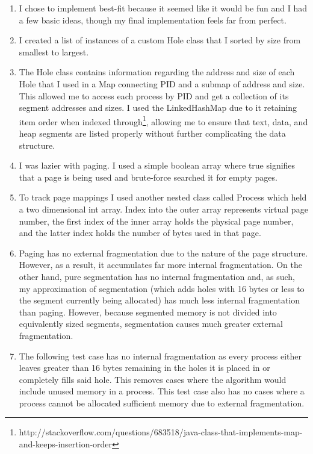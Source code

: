 \documentclass{article}
\begin{document}
\begin{enumerate}
	\item I chose to implement best-fit because it seemed like it would be fun and I had a few basic ideas, though my final implementation feels far from perfect.
	\item I created a list of instances of a custom Hole class that I sorted by size from smallest to largest.
	\item The Hole class contains information regarding the address and size of each Hole that I used in a Map connecting PID and a submap of address and size. This allowed me to access each process by PID and get a collection of its segment addresses and sizes. I used the LinkedHashMap due to it retaining item order when indexed through\footnote{http://stackoverflow.com/questions/683518/java-class-that-implements-map-and-keeps-insertion-order}, allowing me to ensure that text, data, and heap segments are listed properly without further complicating the data structure.
	\item I was lazier with paging. I used a simple boolean array where true signifies that a page is being used and brute-force searched it for empty pages.
	\item To track page mappings I used another nested class called Process which held a two dimensional int array. Index into the outer array represents virtual page number, the first index of the inner array holds the physical page number, and the latter index holds the number of bytes used in that page.
	\item Paging has no external fragmentation due to the nature of the page structure. However, as a result, it accumulates far more internal fragmentation. On the other hand, pure segmentation has no internal fragmentation and, as such, my approximation of segmentation (which adds holes with 16 bytes or less to the segment currently being allocated) has much less internal fragmentation than paging. However, because segmented memory is not divided into equivalently sized segments, segmentation causes much greater external fragmentation.
	\item The following test case has no internal fragmentation as every process either leaves greater than 16 bytes remaining in the holes it is placed in or completely fills said hole. This removes cases where the algorithm would include unused memory in a process. This test case also has no cases where a process cannot be allocated sufficient memory due to external fragmentation.\\

\end{enumerate}
\end{document}
